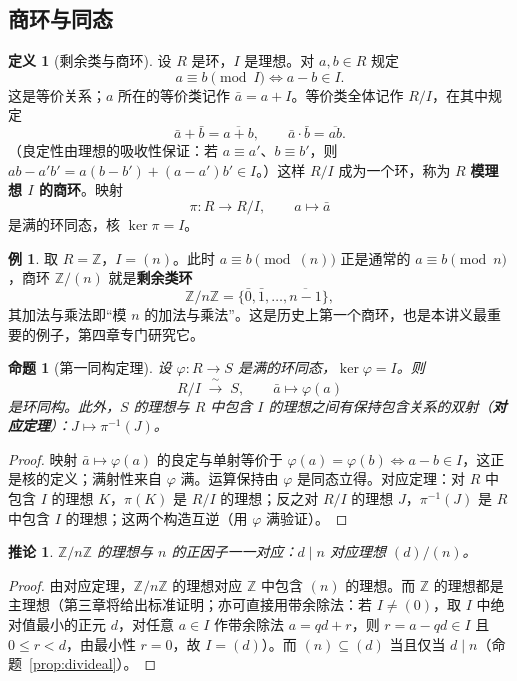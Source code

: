 \documentclass[a4paper,11pt]{ctexart}
\numberwithin{equation}{section}
\theoremstyle{plain}
\newtheorem{proposition}[theorem]{命题}
\newtheorem{corollary}[theorem]{推论}
\theoremstyle{definition}
\newtheorem{definition}[theorem]{定义}
\newtheorem{example}[theorem]{例}
\theoremstyle{remark}
\newcommand{\Z}{\mathbb{Z}}
\begin{document}
\subsection{商环与同态}\label{sec:quotient}

\begin{definition}[剩余类与商环]\label{def:quotientring}
设 $R$ 是环，$I$ 是理想。对 $a,b\in R$ 规定
\[
a\equiv b \pmod I \iff a-b\in I .
\]
这是等价关系；$a$ 所在的等价类记作 $\bar a=a+I$。等价类全体记作 $R/I$，在其中规定
\[
\bar a+\bar b=\overline{a+b},\qquad \bar a\cdot\bar b=\overline{ab}.
\]
（良定性由理想的吸收性保证：若 $a\equiv a'$、$b\equiv b'$，则 $ab-a'b'=a(b-b')+(a-a')b'\in I$。）这样 $R/I$ 成为一个环，称为 $R$ \textbf{模理想 $I$ 的商环}。映射
\[
\pi\colon R\to R/I,\qquad a\mapsto \bar a
\]
是满的环同态，核 $\ker\pi=I$。
\end{definition}

\begin{example}
取 $R=\Z$，$I=(n)$。此时 $a\equiv b \pmod{(n)}$ 正是通常的 $a\equiv b\pmod n$，商环 $\Z/(n)$ 就是\textbf{剩余类环}
\[
\Z/n\Z=\{\bar 0,\bar 1,\dots,\overline{n-1}\},
\]
其加法与乘法即“模 $n$ 的加法与乘法”。这是历史上第一个商环，也是本讲义最重要的例子，第四章专门研究它。
\end{example}

\begin{proposition}[第一同构定理]\label{prop:iso1}
设 $\varphi\colon R\to S$ 是满的环同态，$\ker\varphi=I$。则
\[
R/I \;\xrightarrow{\ \sim\ }\; S,\qquad \bar a\mapsto \varphi(a)
\]
是环同构。此外，$S$ 的理想与 $R$ 中包含 $I$ 的理想之间有保持包含关系的双射（\textbf{对应定理}）：$J\mapsto \pi^{-1}(J)$。
\end{proposition}

\begin{proof}
映射 $\bar a\mapsto\varphi(a)$ 的良定与单射等价于 $\varphi(a)=\varphi(b)\iff a-b\in I$，这正是核的定义；满射性来自 $\varphi$ 满。运算保持由 $\varphi$ 是同态立得。对应定理：对 $R$ 中包含 $I$ 的理想 $K$，$\pi(K)$ 是 $R/I$ 的理想；反之对 $R/I$ 的理想 $J$，$\pi^{-1}(J)$ 是 $R$ 中包含 $I$ 的理想；这两个构造互逆（用 $\varphi$ 满验证）。
\end{proof}

\begin{corollary}
$\Z/n\Z$ 的理想与 $n$ 的正因子一一对应：$d\mid n$ 对应理想 $(d)/(n)$。
\end{corollary}

\begin{proof}
由对应定理，$\Z/n\Z$ 的理想对应 $\Z$ 中包含 $(n)$ 的理想。而 $\Z$ 的理想都是主理想（第三章将给出标准证明；亦可直接用带余除法：若 $I\neq(0)$，取 $I$ 中绝对值最小的正元 $d$，对任意 $a\in I$ 作带余除法 $a=qd+r$，则 $r=a-qd\in I$ 且 $0\le r<d$，由最小性 $r=0$，故 $I=(d)$）。而 $(n)\subseteq (d)$ 当且仅当 $d\mid n$（命题~\ref{prop:divideal}）。
\end{proof}
\end{document}
